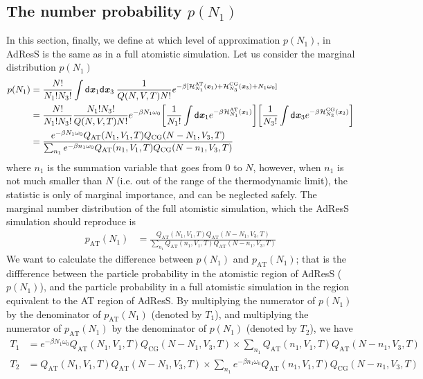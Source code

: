 \documentclass[aip,jcp,a4paper,reprint,onecolumn]{revtex4-1}
\newcommand{\vect}[1]{\textbf{\textit{#1}}}
\newcommand{\dd}[1]{\textsf{#1}}
\newcommand{\AT}{{\textrm{{AT}}}}
\newcommand{\CG}{{\textrm{CG}}}
\begin{document}
\subsection{The number probability $p(N_1)$}
In this section, finally, we define at which level of approximation $p(N_{1})$, in AdResS is the same as in a full atomistic simulation.
Let us consider the marginal distribution $p(N_1)$
\begin{align}\nonumber
  p(N_1)
  &=
  \frac{N!}{N_1!N_3!}
  \int
  \dd d\vect x_1\dd d\vect x_3  \:
  \frac{1}{Q(N,V,T) N!}
  e^{-\beta
    [\mathcal H_{N_1}^{\AT}(\vect x_1) +
    \mathcal H_{N_3}^{\CG}(\vect x_3) +
    N_1\omega_0]}\\\nonumber
  &=
  \frac{N!}{N_1!N_3!}
  \frac{N_1!N_3!}{Q(N,V,T) N!}
  e^{-\beta N_1\omega_0}
  \bigg[
  \frac1{N_1!}
  \int
  \dd d\vect x_1
  e^{-\beta \mathcal H_{N_1}^{\AT}(\vect x_1)}
  \bigg]
  \bigg[
  \frac1{N_3!}
  \int
  \dd d\vect x_3
  e^{-\beta \mathcal H_{N_3}^{\CG}(\vect x_3)}
  \bigg]  \\\label{eqn:pn1}
  &=
  \frac
  {
    e^{-\beta N_1\omega_0}
    Q_{\AT}(N_1,V_1,T) Q_{\CG}(N-N_1,V_3,T)
  }
  {
    \sum_{n_1}
    e^{-\beta n_1\omega_0}
    Q_{\AT}(n_1,V_1,T) Q_{\CG}(N-n_1,V_3,T)
  }
\end{align}
where $n_1$ is the summation variable that goes from 0 to $N$,
however, when $n_1$ is not much smaller than $N$ (i.e. out of the range of the
thermodynamic limit), the statistic is only of marginal importance,
and can be neglected safely.
The marginal number distribution of the full atomistic simulation,
which the AdResS simulation should
reproduce is
\begin{align}
  p_{\AT}(N_1)
  &=
  \frac
  {
    Q_{\AT}(N_1,V_1,T) Q_{\AT}(N-N_1,V_3,T)
  }
  {
    \sum_{n_1}
    Q_{\AT}(n_1,V_1,T) Q_{\AT}(N-n_1,V_3,T)
  }  
\end{align}
We want to calculate the difference between $p(N_1)$ and $p_{\AT}(N_1)$; that is the diffference between the particle probability in the atomistic region of AdResS ($p(N_{1})$), and the particle probability in a full atomistic simulation in the region equivalent to the AT region of AdResS.
By multiplying the numerator of $p(N_1)$ by the denominator of
$p_{\AT}(N_1)$ (denoted by $T_1$),
and multiplying the numerator of $p_{\AT}(N_1)$
by the denominator of $p(N_1)$ (denoted by $T_2$), we have
\begin{align}
  T_1
  &=
  e^{-\beta N_1\omega_0}
  Q_{\AT}(N_1,V_1,T) Q_{\CG}(N-N_1,V_3,T)
  \times
  \sum_{n_1}
  Q_{\AT}(n_1,V_1,T) Q_{\AT}(N-n_1,V_3,T)\\
  T_2
  &=
  Q_{\AT}(N_1,V_1,T) Q_{\AT}(N-N_1,V_3,T)
  \times
  \sum_{n_1}
  e^{-\beta n_1\omega_0}
  Q_{\AT}(n_1,V_1,T) Q_{\CG}(N-n_1,V_3,T)
\end{align}
\end{document}
